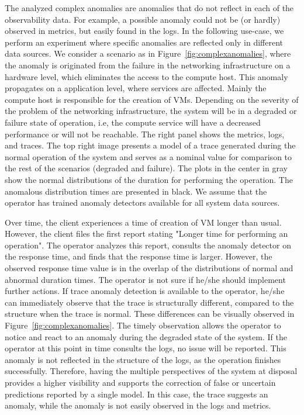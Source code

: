 The analyzed complex anomalies are anomalies that do not reflect in each of the observability data. For example, a possible anomaly could not be (or hardly) observed in metrics, but easily found in the logs. In the following use-case, we perform an experiment where specific anomalies are reflected only in different data sources. We consider a scenario as in Figure~\ref{fig:complexanomalies}, where the anomaly is originated from the failure in the networking infrastructure on a hardware level, which eliminates the access to the compute host. This anomaly propagates on a application level, where services are affected. Mainly the compute host is responsible for the creation of VMs. Depending on the severity of the problem of the networking infrastructure, the system will be in a degraded or failure state of operation, i.e, the compute service will have a decreased performance or will not be reachable. The right panel shows the metrics, logs, and traces. The top right image presents a model of a trace generated during the normal operation of the system and serves as a nominal value for comparison to the rest of the scenarios (degraded and failure). The plots in the center in gray show the normal distributions of the duration for performing the operation. The anomalous distribution times are presented in black. We assume that the operator has trained anomaly detectors available for all system data sources.

Over time, the client experiences a time of creation of VM longer than usual. However, the client files the first report stating "Longer time for performing an operation". The operator analyzes this report, consults the anomaly detector on the response time, and finds that the response time is larger. However, the observed response time value is in the overlap of the distributions of normal and abnormal duration times. The operator is not sure if he/she should implement further actions. If trace anomaly detection is available to the operator, he/she can immediately observe that the trace is structurally different, compared to the structure when the trace is normal. These differences can be visually observed in Figure~\ref{fig:complexanomalies}. 
The timely observation allows the operator to notice and react to an anomaly during the degraded state of the system. If the operator at this point in time consults the logs, no issue will be reported. This anomaly is not reflected in the structure of the logs, as the operation finishes successfully. Therefore, having the multiple perspectives of the system at disposal provides a higher visibility and supports the correction of false or uncertain predictions reported by a single model. In this case, the trace suggests an anomaly, while the anomaly is not easily observed in the logs and metrics.

